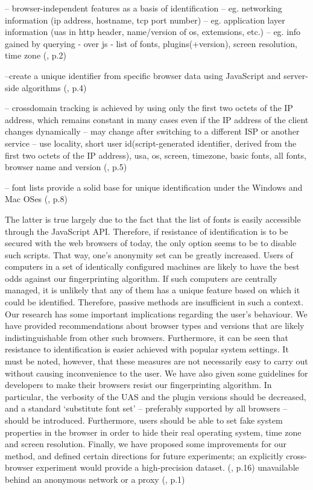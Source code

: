 -- browser-independent features as a basis of identification
-- eg. networking information (ip address, hostname, tcp port number)
-- eg. application layer information (uas in http header, name/version of os, extemsions, etc.)
-- eg. info gained by querying - over js - list of fonts, plugins(+version), screen resolution, time zone
(\textcite{boda11}, p.2)

--create a unique identifier from specific browser data using JavaScript and server-side algorithms
(\textcite{boda11}, p.4)

-- crossdomain tracking is achieved by using only the first two octets of the IP address, which
remains constant in many cases even if the IP address of the client changes dynamically
-- may change after switching to a different ISP or another service
-- use locality, short user id(script-generated identifier, derived from the first two octets of the IP address), usa, os, screen, timezone, basic fonts, all fonts, browser name and version
(\textcite{boda11}, p.5)

-- font lists provide a solid base for unique identification under the Windows and Mac OSes
(\textcite{boda11}, p.8)

 The latter is true largely due to the fact that the list
of fonts is easily accessible through the JavaScript API. Therefore, if resistance of
identification is to be secured with the web browsers of today, the only option seems
to be to disable such scripts. That way, one’s anonymity set can be greatly increased.
Users of computers in a set of identically configured machines are likely to have
the best odds against our fingerprinting algorithm. If such computers are centrally
managed, it is unlikely that any of them has a unique feature based on which it could
be identified. Therefore, passive methods are insufficient in such a context.
Our research has some important implications regarding the user’s behaviour. We
have provided recommendations about browser types and versions that are likely
indistinguishable from other such browsers. Furthermore, it can be seen that
resistance to identification is easier achieved with popular system settings. It must be
noted, however, that these measures are not necessarily easy to carry out without
causing inconvenience to the user.
We have also given some guidelines for developers to make their browsers resist
our fingerprinting algorithm. In particular, the verbosity of the UAS and the plugin
versions should be decreased, and a standard ‘substitute font set’ – preferably
supported by all browsers – should be introduced. Furthermore, users should be able
to set fake system properties in the browser in order to hide their real operating
system, time zone and screen resolution.
Finally, we have proposed some improvements for our method, and defined certain
directions for future experiments; an explicitly cross-browser experiment would
provide a high-precision dataset. 
(\textcite{boda11}, p.16)
unavailable behind an anonymous network or a proxy (\textcite{Cao17}, p.1)



